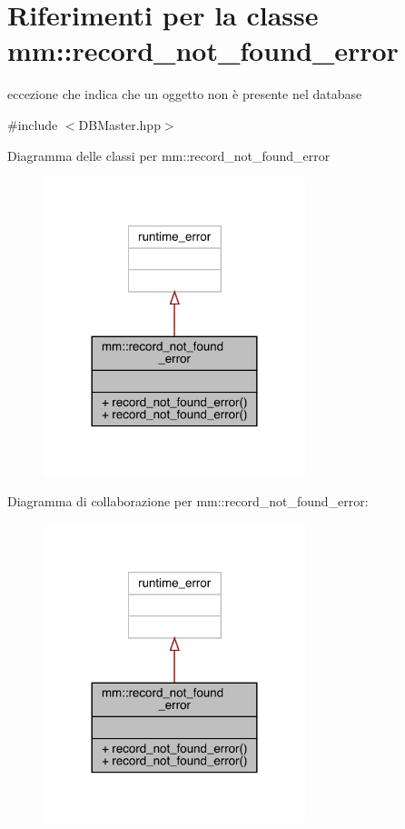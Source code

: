 \hypertarget{classmm_1_1record__not__found__error}{}\section{Riferimenti per la classe mm\+:\+:record\+\_\+not\+\_\+found\+\_\+error}
\label{classmm_1_1record__not__found__error}


eccezione che indica che un oggetto non è presente nel database  




{\ttfamily \#include $<$D\+B\+Master.\+hpp$>$}



Diagramma delle classi per mm\+:\+:record\+\_\+not\+\_\+found\+\_\+error\nopagebreak
\begin{figure}[H]
\begin{center}
\leavevmode
\includegraphics[width=216pt]{dc/dd2/classmm_1_1record__not__found__error__inherit__graph}
\end{center}
\end{figure}


Diagramma di collaborazione per mm\+:\+:record\+\_\+not\+\_\+found\+\_\+error\+:\nopagebreak
\begin{figure}[H]
\begin{center}
\leavevmode
\includegraphics[width=216pt]{da/d69/classmm_1_1record__not__found__error__coll__graph}
\end{center}
\end{figure}
